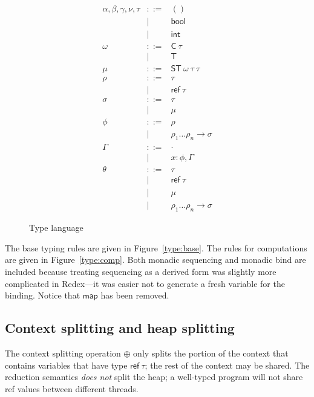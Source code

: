 \documentclass[twocolumn]{article}
\newcommand{\bnfdef}{::=}
\newcommand{\bnfalt}{\mathrel{\mid}}
\newcommand{\kw}[1]{\textsf{#1}}
\begin{document}
\begin{figure}
\begin{equation*}
\begin{array}{lcl}
  \alpha, \beta, \gamma, \nu, \tau
     & \bnfdef & () \\
     & \bnfalt & \kw{bool} \\
     & \bnfalt & \kw{int} \\
  \omega
     & \bnfdef & \kw{C}~ \tau \\
     & \bnfalt & \kw{T} \\
  \mu
     & \bnfdef & \kw{ST}~ \omega~ \tau~ \tau~ \\
  \rho
     & \bnfdef & \tau \\
     & \bnfalt & \kw{ref}~ \tau \\
  \sigma
     & \bnfdef & \tau \\
     & \bnfalt & \mu \\
  \phi
     & \bnfdef & \rho \\
     & \bnfalt & \rho_1 \ldots \rho_n \to \sigma \\
  \Gamma
     & \bnfdef & \cdot \\
     & \bnfalt & x : \phi, \Gamma \\
  \theta
     & \bnfdef & \tau \\
     & \bnfalt & \kw{ref}~ \tau \\
     & \bnfalt & \mu \\
     & \bnfalt & \rho_1 \ldots \rho_n \to \sigma
\end{array}
\end{equation*}
\caption{Type language}
\label{fig:lang:type}
\end{figure}

The base typing rules are given in Figure~\ref{type:base}. The rules for
computations are given in Figure~\ref{type:comp}. Both monadic sequencing and
monadic bind are included because treating sequencing as a derived form was
slightly more complicated in Redex---it was easier not to generate a fresh
variable for the binding. Notice that $\kw{map}$ has been removed.

\subsection{Context splitting and heap splitting}

The context splitting operation $\oplus$ only splits the portion of the context
that contains variables that have type $\kw{ref}~ \tau$; the rest of the context
may be shared. The reduction semantics \emph{does not} split the heap; a
well-typed program will not share \kw{ref} values between different threads.
\end{document}

